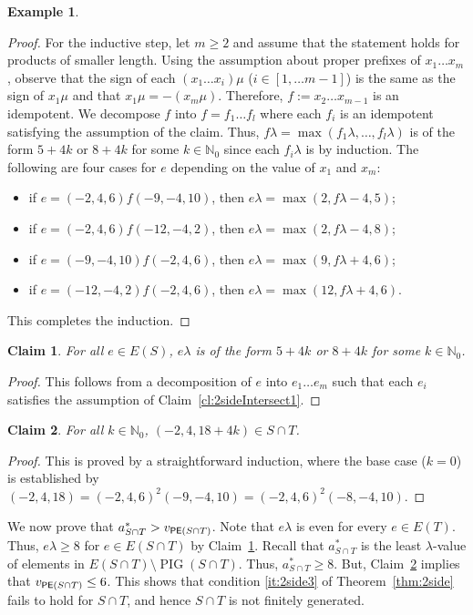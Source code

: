 \documentclass[reqno]{amsart}
\theoremstyle{plain}
\newtheorem{claim}{Claim}[lem]
\theoremstyle{definition}
\newtheorem{ex}[lem]{Example}
\DeclareMathOperator{\PIG}{PIG}
\DeclareMathOperator{\PE}{\textup{\textsf{PE}}}
\newenvironment{bulletmidsentence}{\begin{itemize}[topsep=0mm, leftmargin=8mm, itemsep=1mm]
}{\end{itemize}}
\numberwithin{equation}{section}
\begin{document}
\begin{ex}
\begin{proof}
For the inductive step, let $m\geq 2$ and assume that the statement holds for products of smaller length.
Using the assumption about proper prefixes of $x_1\dots x_m$, 
observe that
the sign of each $(x_1\dots x_i)\mu$ ($i\in [1,\dots m-1]$) is the same as the sign of $x_1\mu$
and that $x_1\mu = -(x_m\mu)$.
Therefore, $f:=x_2\dots x_{m-1}$ is an idempotent. We decompose $f$ into $f=f_1\dots f_l$ where each $f_i$ is an idempotent satisfying the assumption of the claim. Thus, $f\lambda = \max(f_1\lambda, \dots, f_l\lambda)$ is of the form $5+4k$ or $8+4k$ for some $k\in\mathbb{N}_0$ since each $f_i\lambda$ is by induction. The following are four cases for $e$ depending on the value of $x_1$ and $x_m$:
\begin{bulletmidsentence}
    \item if $e = (-2, 4, 6)f(-9,-4,10)$, then $e\lambda = \max(2, f\lambda -4, 5)$;
    \item if $e = (-2, 4, 6)f(-12, -4, 2)$, then $e\lambda = \max(2, f\lambda-4, 8)$;
    \item if $e = (-9, -4, 10)f(-2, 4, 6)$, then $e\lambda = \max(9, f\lambda + 4, 6)$;
    \item if $e = (-12, -4, 2)f(-2, 4, 6)$, then $e\lambda = \max(12, f\lambda+4, 6)$.
\end{bulletmidsentence}
This completes the induction.
\end{proof}

\begin{claim}
\label{cl:2sideIntersect2}
For all $e\in E(S)$, $e\lambda$ is of the form $5+4k$ or $8+4k$ for some $k\in\mathbb{N}_0$.
\end{claim}

\begin{proof}
This follows from a decomposition of $e$ into $e_1\dots e_m$ such that each $e_i$ satisfies the assumption of Claim~\ref{cl:2sideIntersect1}.
\end{proof}

\begin{claim}
\label{cl:2sideIntersect3}
For all $k\in\mathbb{N}_0$, $(-2, 4, 18+4k)\in S\cap T$.
\end{claim}
\begin{proof}
This is proved by a straightforward induction, where the base case ($k=0$) is established by $
(-2, 4, 18) = (-2, 4, 6)^2(-9,-4,10) = (-2, 4, 6)^2(-8, -4, 10)$.
\end{proof}
We now prove that $a^\ast_{S\cap T} > v_{\PE(S\cap T)}$. Note that $e\lambda$ is even for every $e\in E(T)$. Thus, $e\lambda\geq 8$ for $e\in E(S\cap T) $ by Claim~\ref{cl:2sideIntersect2}. Recall that $a_{S\cap T}^\ast$ is the least $\lambda$-value of elements in $E(S\cap T)\setminus\PIG(S\cap T)$. Thus, $a_{S\cap T}^\ast \geq 8$. But, Claim~\ref{cl:2sideIntersect3} implies that $v_{\PE(S\cap T)}\leq 6$. This shows 
that condition \ref{it:2side3} of Theorem~\ref{thm:2side} fails to hold for $S\cap T$, and hence $S\cap T$ is not finitely generated.
\end{ex}
\end{document}
